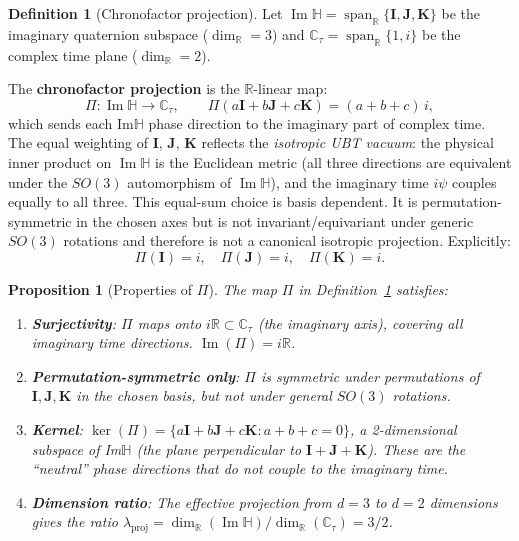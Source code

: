 \documentclass[12pt,a4paper]{article}
\newtheorem{proposition}[theorem]{Proposition}
\theoremstyle{definition}
\newtheorem{definition}[theorem]{Definition}
\theoremstyle{remark}
\begin{document}
\begin{definition}[Chronofactor projection]
\label{def:chron:Pi}
Let $\operatorname{Im}\mathbb{H} = \operatorname{span}_\mathbb{R}\{\mathbf{I}, \mathbf{J}, \mathbf{K}\}$
be the imaginary quaternion subspace ($\dim_\mathbb{R} = 3$) and
$\mathbb{C}_\tau = \operatorname{span}_\mathbb{R}\{1, i\}$ be the complex time plane
($\dim_\mathbb{R} = 2$).

The \textbf{chronofactor projection} is the $\mathbb{R}$-linear map:
\begin{equation}
  \Pi: \operatorname{Im}\mathbb{H} \to \mathbb{C}_\tau,
  \qquad
  \Pi(a\mathbf{I} + b\mathbf{J} + c\mathbf{K}) = (a + b + c)\,i,
  \label{eq:chron:Pi}
\end{equation}
which sends each Im$\mathbb{H}$ phase direction to the imaginary part of complex time.
The equal weighting of $\mathbf{I}$, $\mathbf{J}$, $\mathbf{K}$ reflects the
\emph{isotropic UBT vacuum}: the physical inner product on
$\operatorname{Im}\mathbb{H}$ is the Euclidean metric (all three directions are
equivalent under the $SO(3)$ automorphism of $\operatorname{Im}\mathbb{H}$), and
the imaginary time $i\psi$ couples equally to all three.
This equal-sum choice is basis dependent. It is permutation-symmetric in the
chosen axes but is not invariant/equivariant under generic $SO(3)$ rotations
and therefore is not a canonical isotropic projection.
Explicitly:
\begin{equation}
  \Pi(\mathbf{I}) = i, \quad
  \Pi(\mathbf{J}) = i, \quad
  \Pi(\mathbf{K}) = i.
  \label{eq:chron:Pi_basis}
\end{equation}
\end{definition}

\begin{proposition}[Properties of $\Pi$]
\label{prop:chron:Pi_props}
The map $\Pi$ in Definition~\ref{def:chron:Pi} satisfies:
\begin{enumerate}
  \item \textbf{Surjectivity}: $\Pi$ maps onto $i\mathbb{R} \subset \mathbb{C}_\tau$
        (the imaginary axis), covering all imaginary time directions. $\operatorname{Im}(\Pi) = i\mathbb{R}$.
  \item \textbf{Permutation-symmetric only}: $\Pi$ is symmetric under
        permutations of $\mathbf{I},\mathbf{J},\mathbf{K}$ in the chosen
        basis, but not under general $SO(3)$ rotations.
  \item \textbf{Kernel}: $\ker(\Pi) = \{a\mathbf{I}+b\mathbf{J}+c\mathbf{K} : a+b+c=0\}$,
        a 2-dimensional subspace of Im$\mathbb{H}$ (the plane perpendicular to
        $\mathbf{I}+\mathbf{J}+\mathbf{K}$).  These are the ``neutral'' phase directions
        that do not couple to the imaginary time.
  \item \textbf{Dimension ratio}: The effective projection from $d=3$ to $d=2$ dimensions
        gives the ratio $\lambda_{\mathrm{proj}} = \dim_\mathbb{R}(\operatorname{Im}\mathbb{H})\big/\dim_\mathbb{R}(\mathbb{C}_\tau) = 3/2$.
\end{enumerate}
\end{proposition}
\end{document}

